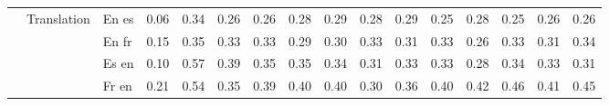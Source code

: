 \begin{center}
\begin{longtable}{lllrrrrrrrrrrrrr}
\cline{2-16}
 & \multirow[t]{4}{*}{Translation} & En es & 0.06 & 0.34 & 0.26 & 0.26 & 0.28 & 0.29 & 0.28 & 0.29 & 0.25 & 0.28 & 0.25 & 0.26 & 0.26 \\
 &  & En fr & 0.15 & 0.35 & 0.33 & 0.33 & 0.29 & 0.30 & 0.33 & 0.31 & 0.33 & 0.26 & 0.33 & 0.31 & 0.34 \\
 &  & Es en & 0.10 & 0.57 & 0.39 & 0.35 & 0.35 & 0.34 & 0.31 & 0.33 & 0.33 & 0.28 & 0.34 & 0.33 & 0.31 \\
 &  & Fr en & 0.21 & 0.54 & 0.35 & 0.39 & 0.40 & 0.40 & 0.30 & 0.36 & 0.40 & 0.42 & 0.46 & 0.41 & 0.45 \\
\cline{1-16} \cline{2-16}
\bottomrule
\end{longtable}

\end{center}
\twocolumn